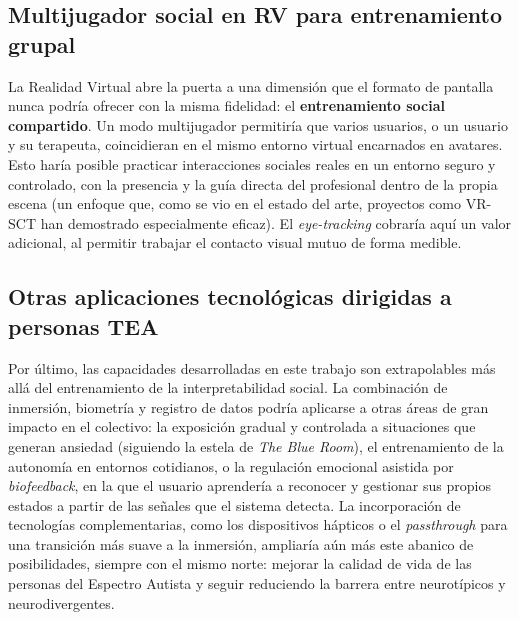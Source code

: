 \documentclass[12pt,twoside,titlepage]{report}
\begin{document}
\subsection{Multijugador social en RV para entrenamiento grupal}

La Realidad Virtual abre la puerta a una dimensión que el formato de pantalla nunca podría ofrecer con la misma fidelidad: el \textbf{entrenamiento social compartido}.
Un modo multijugador permitiría que varios usuarios, o un usuario y su terapeuta, coincidieran en el mismo entorno virtual encarnados en avatares.
Esto haría posible practicar interacciones sociales reales en un entorno seguro y controlado, con la presencia y la guía directa del profesional dentro de la propia escena (un enfoque que, como se vio en el estado del arte, proyectos como VR-SCT han demostrado especialmente eficaz).
El \textit{eye-tracking} cobraría aquí un valor adicional, al permitir trabajar el contacto visual mutuo de forma medible.

\subsection{Otras aplicaciones tecnológicas dirigidas a personas TEA}

Por último, las capacidades desarrolladas en este trabajo son extrapolables más allá del entrenamiento de la interpretabilidad social.
La combinación de inmersión, biometría y registro de datos podría aplicarse a otras áreas de gran impacto en el colectivo: la exposición gradual y controlada a situaciones que generan ansiedad (siguiendo la estela de \textit{The Blue Room}), el entrenamiento de la autonomía en entornos cotidianos, o la regulación emocional asistida por \textit{biofeedback}, en la que el usuario aprendería a reconocer y gestionar sus propios estados a partir de las señales que el sistema detecta.
La incorporación de tecnologías complementarias, como los dispositivos hápticos o el \textit{passthrough} para una transición más suave a la inmersión, ampliaría aún más este abanico de posibilidades, siempre con el mismo norte: mejorar la calidad de vida de las personas del Espectro Autista y seguir reduciendo la barrera entre neurotípicos y neurodivergentes.

\vspace{-1.5cm}

% 
% 


\newpage                %
\thispagestyle{empty}   %
\null                   %
\clearpage              %



\printbibliography[title={Bibliografía}]


\end{document}
